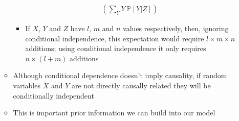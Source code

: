 \documentclass[11pt]{article}
\newcommand{\Prob}[2][]{\mathbb{P}_{#1\!}\left[ #2 \right]}
\begin{document}
\begin{itemize}
\begin{itemize}
\begin{align*}
\left( \sum_{Y} Y\, \Prob{Y|Z}\right)
\end{align*}
\begin{itemize}
\item If \(X\), \(Y\) and \(Z\) have \(l\), \(m\) and \(n\) values respectively, then,
ignoring conditional independence, this expectation would
require \(l\times m\times n\) additions; using conditional
independence it only requires \(n\times(l+m)\) additions
\end{itemize}
\item Although conditional dependence doesn't imply causality,
if random variables \(X\) and \(Y\) are not directly causally
related they will be conditionally independent
\item This is important prior information we can build into our
model
\end{itemize}
\end{itemize}
\end{document}
